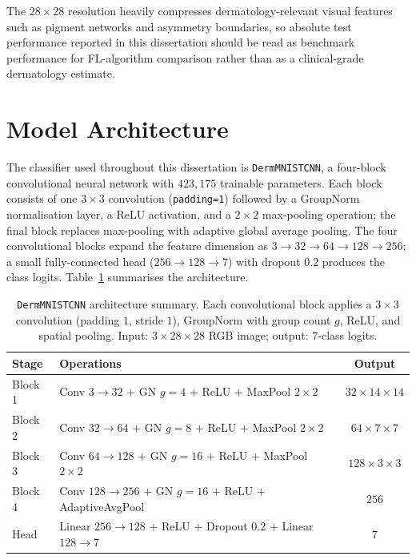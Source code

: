 \documentclass[11pt,a4paper]{report}
\begin{document}
The $28\times28$ resolution heavily compresses dermatology-relevant
visual features such as pigment networks and asymmetry boundaries,
so absolute test performance reported in this dissertation should
be read as benchmark performance for FL-algorithm comparison rather
than as a clinical-grade dermatology estimate.

\section{Model Architecture}
\label{sec:methods-model}

The classifier used throughout this dissertation is
\texttt{DermMNISTCNN}, a four-block convolutional neural network
with $423{,}175$ trainable parameters. Each block consists of one
$3\times3$ convolution (\texttt{padding=1}) followed by a
GroupNorm normalisation layer, a ReLU activation, and a
$2\times2$ max-pooling operation; the final block replaces
max-pooling with adaptive global average pooling. The four
convolutional blocks expand the feature dimension as
$3 \to 32 \to 64 \to 128 \to 256$; a small fully-connected head
($256 \to 128 \to 7$) with dropout $0.2$ produces the class
logits. Table~\ref{tab:model-summary} summarises the architecture.

\begin{table}[!htbp]
\centering
\caption{\texttt{DermMNISTCNN} architecture summary. Each
convolutional block applies a $3\times3$ convolution (padding
$1$, stride $1$), GroupNorm with group count $g$, ReLU, and
spatial pooling. Input: $3 \times 28 \times 28$ RGB image;
output: $7$-class logits.}
\label{tab:model-summary}
\small
\begin{tabular}{llc}
\toprule
Stage & Operations & Output \\
\midrule
Block 1 & Conv $3 \to 32$ $+$ GN $g{=}4$ $+$ ReLU $+$ MaxPool $2\times2$    & $32 \times 14 \times 14$ \\
Block 2 & Conv $32 \to 64$ $+$ GN $g{=}8$ $+$ ReLU $+$ MaxPool $2\times2$   & $64 \times 7 \times 7$ \\
Block 3 & Conv $64 \to 128$ $+$ GN $g{=}16$ $+$ ReLU $+$ MaxPool $2\times2$ & $128 \times 3 \times 3$ \\
Block 4 & Conv $128 \to 256$ $+$ GN $g{=}16$ $+$ ReLU $+$ AdaptiveAvgPool   & $256$ \\
Head    & Linear $256 \to 128$ $+$ ReLU $+$ Dropout $0.2$ $+$ Linear $128 \to 7$ & $7$ \\
\bottomrule
\end{tabular}
\end{table}
\end{document}
